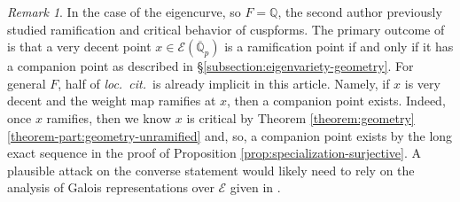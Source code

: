 \documentclass[10pt, twoside]{amsart}
\theoremstyle{plain}
\theoremstyle{definition}
\theoremstyle{remark}
\newtheorem{remark}[theorem]{Remark}
\numberwithin{equation}{subsection}
\def\Q{\mathbb Q}
\def\scre{\mathscr E}
\def\qpbar{\overline{\mathbb Q}_p}
\begin{document}
\begin{remark}
In the case of the eigencurve, so $F = \Q$, the second author previously studied ramification and critical behavior of cuspforms. The primary outcome of \cite[Theorem 1.1]{Bergdall-CompanionPoints} is that a very decent point $x \in \scre(\qpbar)$ is a ramification point if and only if it has a companion point as described in \S \ref{subsection:eigenvariety-geometry}. For general $F$, half of {\em loc.\ cit.}\ is already implicit in this article. Namely, if $x$ is very decent and the weight map ramifies at $x$, then a companion point exists. Indeed, once $x$ ramifies, then we know $x$ is critical by Theorem \ref{theorem:geometry}\ref{theorem-part:geometry-unramified} and, so, a companion point exists by the long exact sequence in the proof of Proposition \ref{prop:specialization-surjective}. A plausible attack on the converse statement would likely need to rely on the analysis of Galois representations over $\scre$ given in \cite[\S 6.6]{BH}.
\end{remark}
\end{document}
